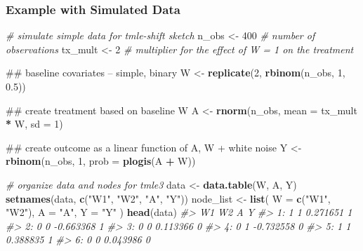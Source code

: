 \documentclass[12pt, krantz2,]{krantz}
\newenvironment{Shaded}{\begin{snugshade}}{\end{snugshade}}
\newcommand{\CommentTok}[1]{\textcolor[rgb]{0.37,0.37,0.37}{\textit{#1}}}
\newcommand{\DataTypeTok}[1]{\textcolor[rgb]{0.27,0.27,0.27}{#1}}
\newcommand{\DecValTok}[1]{\textcolor[rgb]{0.06,0.06,0.06}{#1}}
\newcommand{\FloatTok}[1]{\textcolor[rgb]{0.06,0.06,0.06}{#1}}
\newcommand{\KeywordTok}[1]{\textcolor[rgb]{0.27,0.27,0.27}{\textbf{#1}}}
\newcommand{\NormalTok}[1]{#1}
\newcommand{\OperatorTok}[1]{\textcolor[rgb]{0.43,0.43,0.43}{\textbf{#1}}}
\newcommand{\StringTok}[1]{\textcolor[rgb]{0.5,0.5,0.5}{#1}}
\theoremstyle{definition}
\theoremstyle{definition}
\theoremstyle{definition}
\newcommand{\1}{\mathbbm{1}}
\begin{document}
\hypertarget{example-with-simulated-data}{%
\subsubsection{Example with Simulated Data}\label{example-with-simulated-data}}

\begin{Shaded}
\begin{Highlighting}[]
\CommentTok{# simulate simple data for tmle-shift sketch}
\NormalTok{n_obs <-}\StringTok{ }\DecValTok{400} \CommentTok{# number of observations}
\NormalTok{tx_mult <-}\StringTok{ }\DecValTok{2} \CommentTok{# multiplier for the effect of W = 1 on the treatment}

\NormalTok{## baseline covariates -- simple, binary}
\NormalTok{W <-}\StringTok{ }\KeywordTok{replicate}\NormalTok{(}\DecValTok{2}\NormalTok{, }\KeywordTok{rbinom}\NormalTok{(n_obs, }\DecValTok{1}\NormalTok{, }\FloatTok{0.5}\NormalTok{))}

\NormalTok{## create treatment based on baseline W}
\NormalTok{A <-}\StringTok{ }\KeywordTok{rnorm}\NormalTok{(n_obs, }\DataTypeTok{mean =}\NormalTok{ tx_mult }\OperatorTok{*}\StringTok{ }\NormalTok{W, }\DataTypeTok{sd =} \DecValTok{1}\NormalTok{)}

\NormalTok{## create outcome as a linear function of A, W + white noise}
\NormalTok{Y <-}\StringTok{ }\KeywordTok{rbinom}\NormalTok{(n_obs, }\DecValTok{1}\NormalTok{, }\DataTypeTok{prob =} \KeywordTok{plogis}\NormalTok{(A }\OperatorTok{+}\StringTok{ }\NormalTok{W))}

\CommentTok{# organize data and nodes for tmle3}
\NormalTok{data <-}\StringTok{ }\KeywordTok{data.table}\NormalTok{(W, A, Y)}
\KeywordTok{setnames}\NormalTok{(data, }\KeywordTok{c}\NormalTok{(}\StringTok{"W1"}\NormalTok{, }\StringTok{"W2"}\NormalTok{, }\StringTok{"A"}\NormalTok{, }\StringTok{"Y"}\NormalTok{))}
\NormalTok{node_list <-}\StringTok{ }\KeywordTok{list}\NormalTok{(}
  \DataTypeTok{W =} \KeywordTok{c}\NormalTok{(}\StringTok{"W1"}\NormalTok{, }\StringTok{"W2"}\NormalTok{),}
  \DataTypeTok{A =} \StringTok{"A"}\NormalTok{,}
  \DataTypeTok{Y =} \StringTok{"Y"}
\NormalTok{)}
\KeywordTok{head}\NormalTok{(data)}
\CommentTok{#>    W1 W2         A Y}
\CommentTok{#> 1:  1  1  0.271651 1}
\CommentTok{#> 2:  0  0 -0.663368 1}
\CommentTok{#> 3:  0  0  0.113366 0}
\CommentTok{#> 4:  0  1 -0.732558 0}
\CommentTok{#> 5:  1  1  0.388835 1}
\CommentTok{#> 6:  0  0  0.043986 0}
\end{Highlighting}
\end{Shaded}
\end{document}
